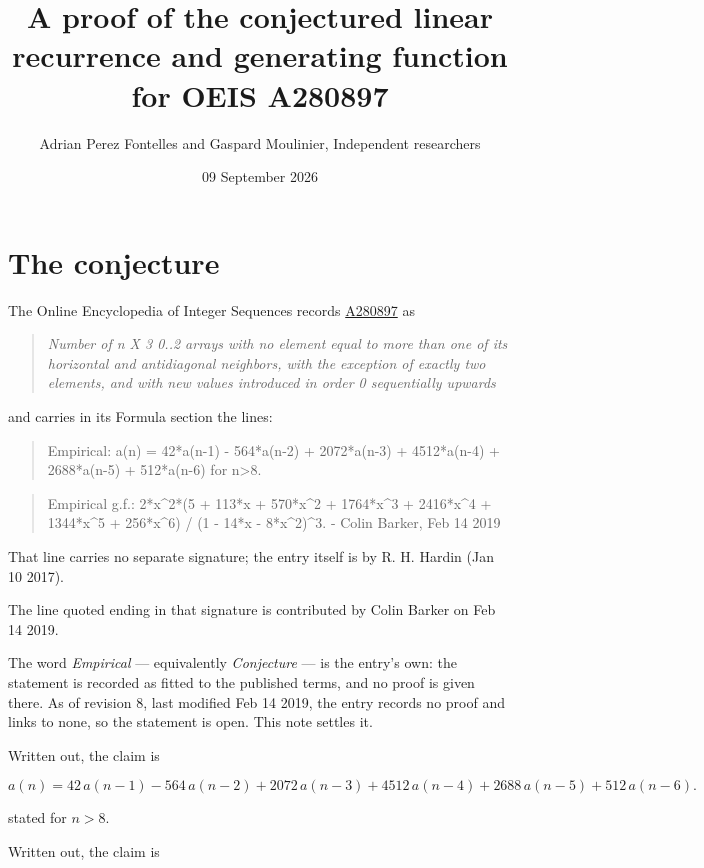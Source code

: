 \documentclass[11pt]{article}
\title{A proof of the conjectured linear recurrence and generating function for OEIS A280897}
\author{Adrian Perez Fontelles and Gaspard Moulinier, Independent researchers}
\date{09 September 2026}
\theoremstyle{definition}
\begin{document}
\maketitle
\section{The conjecture}

The Online Encyclopedia of Integer Sequences records \href{https://oeis.org/A280897}{A280897} as

\begin{quote}\itshape Number of n X 3 0..2 arrays with no element equal to more than one of its horizontal and antidiagonal neighbors, with the exception of exactly two elements, and with new values introduced in order 0 sequentially upwards\end{quote}

and carries in its Formula section the lines:

\begin{quote}\ttfamily Empirical: a(n) = 42*a(n-1) - 564*a(n-2) + 2072*a(n-3) + 4512*a(n-4) + 2688*a(n-5) + 512*a(n-6) for n>8.\end{quote}

\begin{quote}\ttfamily Empirical g.f.: 2*x\textasciicircum{}2*(5 + 113*x + 570*x\textasciicircum{}2 + 1764*x\textasciicircum{}3 + 2416*x\textasciicircum{}4 + 1344*x\textasciicircum{}5 + 256*x\textasciicircum{}6) / (1 - 14*x - 8*x\textasciicircum{}2)\textasciicircum{}3. - Colin Barker, Feb 14 2019\end{quote}

That line carries no separate signature; the entry itself is by R. H. Hardin (Jan 10 2017).

The line quoted ending in that signature is contributed by Colin Barker on Feb 14 2019.

The word {\itshape Empirical} --- equivalently {\itshape Conjecture} --- is the entry's own: the statement is recorded as fitted to the published terms, and no proof is given there. As of revision 8, last modified Feb 14 2019, the entry records no proof and links to none, so the statement is open. This note settles it.

Written out, the claim is

\[a(n) = 42\,a(n-1) - 564\,a(n-2) + 2072\,a(n-3) + 4512\,a(n-4) + 2688\,a(n-5) + 512\,a(n-6).\]

stated for $n > 8$.

Written out, the claim is
\end{document}
